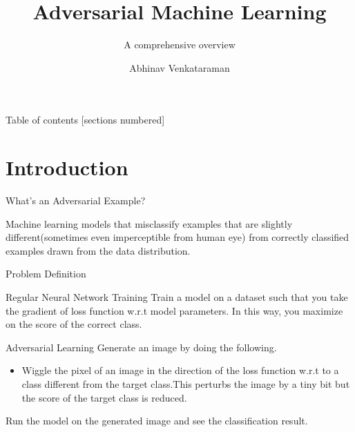 \documentclass[10pt]{beamer}
\title{Adversarial Machine Learning}
\subtitle{A comprehensive overview}
\date{}
\author{Abhinav Venkataraman}
\institute{Samsung SDS Research America}
\begin{document}
\maketitle

\begin{frame}{Table of contents}
  [sections numbered]
  \tableofcontents[hideallsubsections]
\end{frame}

\section{Introduction}

\begin{frame}[fragile]{What's an Adversarial Example?}

Machine learning models that misclassify examples that are slightly different(sometimes even imperceptible from human eye) from correctly classified examples drawn from the data distribution.

\end{frame}

\begin{frame}{Problem Definition}
\begin{exampleblock}{Regular Neural Network Training}
Train a model on a dataset such that you take the gradient of loss function w.r.t model parameters. In this way, you maximize on the score of the correct class.	
\end{exampleblock}

\begin{alertblock}{Adversarial Learning}
Generate an image by doing the following.
\begin{itemize}
	\item Wiggle the pixel of an image in the direction of the loss function w.r.t to a class different from the target class.This perturbs the image by a tiny bit but the score of the target class is reduced. 
\end{itemize}  
Run the model on the generated image and see the classification result. 
\end{alertblock}

\end{frame}
\end{document}
